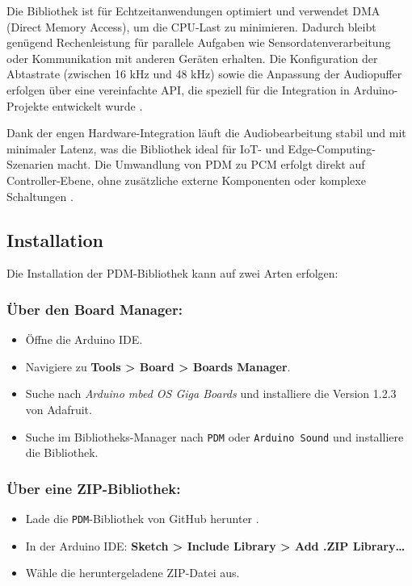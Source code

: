 Die Bibliothek ist für Echtzeitanwendungen optimiert und verwendet DMA (Direct Memory Access), um die CPU-Last zu minimieren. Dadurch bleibt genügend Rechenleistung für parallele Aufgaben wie Sensordatenverarbeitung oder Kommunikation mit anderen Geräten erhalten. Die Konfiguration der Abtastrate (zwischen 16 kHz und 48 kHz) sowie die Anpassung der Audiopuffer erfolgen über eine vereinfachte API, die speziell für die Integration in Arduino-Projekte entwickelt wurde \cite{ArduinoPDM:2023}.

Dank der engen Hardware-Integration läuft die Audiobearbeitung stabil und mit minimaler Latenz, was die Bibliothek ideal für IoT- und Edge-Computing-Szenarien macht. Die Umwandlung von PDM zu PCM erfolgt direkt auf Controller-Ebene, ohne zusätzliche externe Komponenten oder komplexe Schaltungen \cite{ArduinoPDM:2023}.

\subsection{Installation}

Die Installation der PDM-Bibliothek kann auf zwei Arten erfolgen:

\subsubsection{Über den Board Manager:}
	\begin{itemize}
		\item Öffne die Arduino IDE.
		\item Navigiere zu \textbf{Tools > Board > Boards Manager}.
		\item Suche nach \textit{Arduino mbed OS Giga Boards} und installiere die Version 1.2.3 von Adafruit.
		\item Suche im Bibliotheks-Manager nach \texttt{PDM} oder \texttt{Arduino Sound} und installiere die Bibliothek.
	\end{itemize}
	
\subsubsection{Über eine ZIP-Bibliothek:}
	\begin{itemize}
		\item Lade die \texttt{PDM}-Bibliothek von GitHub herunter \cite{Arduino:2025PDMlib}.
		\item In der Arduino IDE: \textbf{Sketch > Include Library > Add .ZIP Library…}
		\item Wähle die heruntergeladene ZIP-Datei aus.
	\end{itemize}

